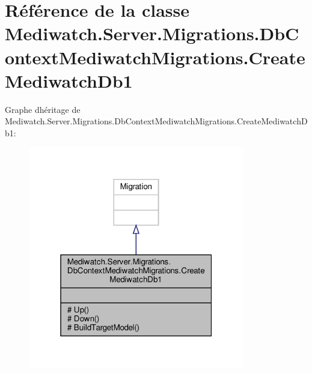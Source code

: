 \hypertarget{class_mediwatch_1_1_server_1_1_migrations_1_1_db_context_mediwatch_migrations_1_1_create_mediwatch_db1}{}\section{Référence de la classe Mediwatch.\+Server.\+Migrations.\+Db\+Context\+Mediwatch\+Migrations.\+Create\+Mediwatch\+Db1}
\label{class_mediwatch_1_1_server_1_1_migrations_1_1_db_context_mediwatch_migrations_1_1_create_mediwatch_db1}


Graphe d\textquotesingle{}héritage de Mediwatch.\+Server.\+Migrations.\+Db\+Context\+Mediwatch\+Migrations.\+Create\+Mediwatch\+Db1\+:\nopagebreak
\begin{figure}[H]
\begin{center}
\leavevmode
\includegraphics[width=268pt]{class_mediwatch_1_1_server_1_1_migrations_1_1_db_context_mediwatch_migrations_1_1_create_mediwatch_db1__inherit__graph}
\end{center}
\end{figure}



